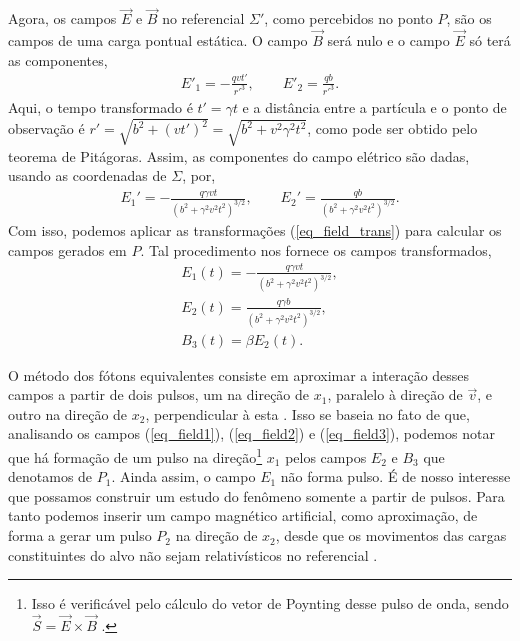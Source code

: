 Agora, os campos $\vec{E}$ e $\vec{B}$ no referencial $\Sigma '$, como
percebidos no ponto $P$, são os campos de uma carga pontual estática. O campo
$\vec{B}$ será nulo e o campo $\vec{E}$ só terá as componentes,
\begin{gather}
	E' _1 = -\frac{qvt'}{{r'}^3}, \qquad
	E' _2 = \frac{qb}{{r'}^3}.
\end{gather}
Aqui, o tempo transformado é $t' = \gamma t$ e a distância entre a partícula e
o ponto de observação é $r' = \sqrt{b^2 + (vt')^2} = \sqrt{b^2 + v^2 \gamma ^2
t^2}$, como pode ser obtido pelo teorema de Pitágoras. Assim, as componentes do
campo elétrico são dadas, usando as coordenadas de $\Sigma$, por,
\begin{gather}
	E _1 '= - \frac{q\gamma vt}{(b^2 + \gamma ^2 v^2 t^2)^{3/2}},\qquad
	E _2 '= \frac{qb}{(b^2 + \gamma ^2 v^2 t^2)^{3/2}}.
\end{gather}
Com isso, podemos aplicar as transformações (\ref{eq_field_trans}) para
calcular os campos gerados em $P$. Tal procedimento nos fornece os campos
transformados,
\begin{gather}%
	E_1 (t) = -\frac{q\gamma vt}{(b^2 + \gamma ^2 v^2t^2)^{3/2}} \label{eq_field1},\\
		E_2 (t) = \frac{q\gamma b}{(b^2 + \gamma ^2 v^2 t ^2)^{3/2}}\label{eq_field2},\\ 
		B_3 (t) = \beta E_2(t) \label{eq_field3}.
\end{gather}

O método dos fótons equivalentes consiste em aproximar a
interação desses campos a partir de dois pulsos, um na direção de $x_1$,
paralelo à direção de $\vec{v}$, e outro na direção de $x_2$, perpendicular à
esta \cite{caruso_quanta}. Isso se baseia no fato de que, analisando os campos (\ref{eq_field1}),
(\ref{eq_field2}) e (\ref{eq_field3}), podemos notar que há formação de um
pulso na direção\footnote{Isso é verificável pelo cálculo do vetor de Poynting
desse pulso de onda, sendo $\vec{S} = \vec{E}\times \vec{B}$ \cite{jackson3}.}
$x_1$ pelos campos $E_2$ e $B_3$ que denotamos de $P_1$.  Ainda assim, o campo
$E_1$ não forma pulso. É de nosso interesse que possamos construir um estudo do
fenômeno somente a partir de pulsos. Para tanto podemos inserir um campo magnético
artificial, como aproximação, de forma a gerar um pulso $P_2$ na direção de
$x_2$, desde que os movimentos das cargas constituintes do alvo não sejam
relativísticos no referencial \cite{jackson3}.

